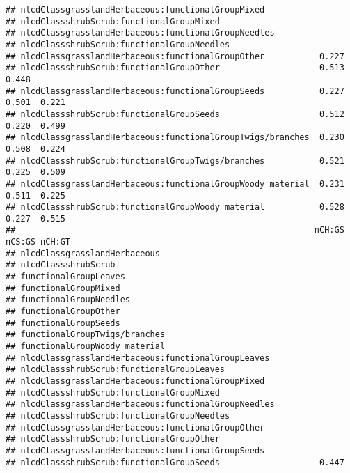 \documentclass[]{article}
\begin{document}
\begin{verbatim}
## nlcdClassgrasslandHerbaceous:functionalGroupMixed                              
## nlcdClassshrubScrub:functionalGroupMixed                                       
## nlcdClassgrasslandHerbaceous:functionalGroupNeedles                            
## nlcdClassshrubScrub:functionalGroupNeedles                                     
## nlcdClassgrasslandHerbaceous:functionalGroupOther           0.227              
## nlcdClassshrubScrub:functionalGroupOther                    0.513  0.448       
## nlcdClassgrasslandHerbaceous:functionalGroupSeeds           0.227  0.501  0.221
## nlcdClassshrubScrub:functionalGroupSeeds                    0.512  0.220  0.499
## nlcdClassgrasslandHerbaceous:functionalGroupTwigs/branches  0.230  0.508  0.224
## nlcdClassshrubScrub:functionalGroupTwigs/branches           0.521  0.225  0.509
## nlcdClassgrasslandHerbaceous:functionalGroupWoody material  0.231  0.511  0.225
## nlcdClassshrubScrub:functionalGroupWoody material           0.528  0.227  0.515
##                                                            nCH:GS nCS:GS nCH:GT
## nlcdClassgrasslandHerbaceous                                                   
## nlcdClassshrubScrub                                                            
## functionalGroupLeaves                                                          
## functionalGroupMixed                                                           
## functionalGroupNeedles                                                         
## functionalGroupOther                                                           
## functionalGroupSeeds                                                           
## functionalGroupTwigs/branches                                                  
## functionalGroupWoody material                                                  
## nlcdClassgrasslandHerbaceous:functionalGroupLeaves                             
## nlcdClassshrubScrub:functionalGroupLeaves                                      
## nlcdClassgrasslandHerbaceous:functionalGroupMixed                              
## nlcdClassshrubScrub:functionalGroupMixed                                       
## nlcdClassgrasslandHerbaceous:functionalGroupNeedles                            
## nlcdClassshrubScrub:functionalGroupNeedles                                     
## nlcdClassgrasslandHerbaceous:functionalGroupOther                              
## nlcdClassshrubScrub:functionalGroupOther                                       
## nlcdClassgrasslandHerbaceous:functionalGroupSeeds                              
## nlcdClassshrubScrub:functionalGroupSeeds                    0.447              

\end{verbatim}
\end{document}
